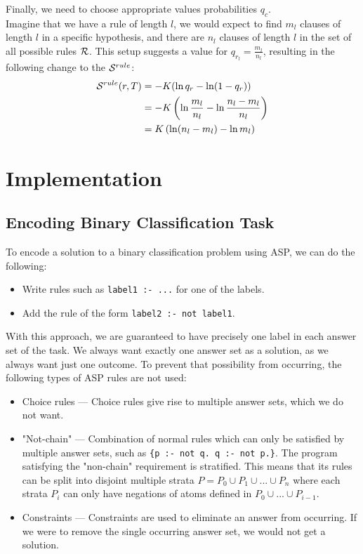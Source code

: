 Finally, we need to choose appropriate values probabilities $q_c$. \\
Imagine that we have a rule of length $l$, we would expect to find $m_l$ clauses of length $l$ in a specific hypothesis, and there are $n_l$ clauses of length $l$ in the set of all possible rules $\mathcal{R}$. 
This setup suggests a value for $q_{r_l} = \frac{m_l}{n_l}$, resulting in the following change to the $\mathcal{S}^{rule}$:
\begin{align}
\mathcal{S}^{rule}(r, T) 
& = -K (\ln q_r - \ln(1-q_r)) \nonumber \\
& = -K \left (\ln \frac{m_l}{n_l} - \ln \frac{n_l - m_l}{n_l} \right) \nonumber \\
& = K \left (\ln (n_l - m_l) - \ln m_l  \right)
\end{align}

\section{Implementation}

\subsection{Encoding Binary Classification Task}
\label{encoding-binary-classification-task}

To encode a solution to a binary classification problem using ASP, we can do the following:
\begin{itemize}
    \item Write rules such as \verb+label1 :- ...+  for one of the labels.
    \item Add the rule of the form \verb+label2 :- not label1+.
\end{itemize}

With this approach, we are guaranteed to have precisely one label in each answer set of the task.
We always want exactly one answer set as a solution, as we always want just one outcome.
To prevent that possibility from occurring, the following types of ASP rules are not used:
\begin{itemize}
    \item Choice rules --- Choice rules give rise to multiple answer sets, which we do not want.
    \item "Not-chain" --- Combination of normal rules which can only be satisfied by multiple answer sets, such as \verb+{p :- not q. q :- not p.}+. The program satisfying the "non-chain" requirement is stratified. This means that its rules can be split into disjoint multiple strata $P = P_0 \cup P_1 \cup ... \cup P_n$ where each strata $P_i$ can only have negations of atoms defined in $P_0 \cup ... \cup P_{i-1}$.
    \item Constraints --- Constraints are used to eliminate an answer from occurring. If we were to remove the single occurring answer set, we would not get a solution.
\end{itemize}

